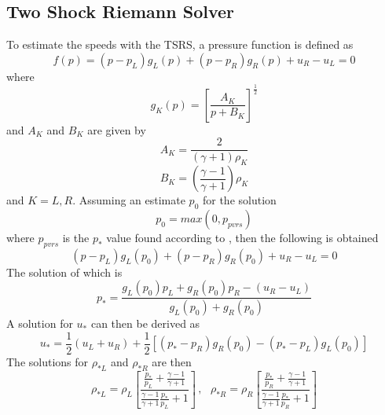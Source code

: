 \subsection{Two Shock Riemann Solver}\label{sect:TSRS}
To estimate the speeds with the TSRS, a pressure function is defined as
\begin{equation}
	f\left(p\right) = \left(p - p_L\right) g_L\left(p\right) + \left(p - p_R\right) g_R\left(p\right) + u_R - u_L = 0
\end{equation}
where
\begin{equation}
	g_K\left(p\right) = \left[\frac{A_K}{p + B_K}\right]^{\frac{1}{2}}
\end{equation}
and $A_K$ and $B_K$ are given by
\begin{equation}
	A_K = \frac{2}{\left(\gamma + 1\right) \rho_K}
\end{equation}
\begin{equation}
	B_K = \left(\frac{\gamma - 1}{\gamma + 1}\right) \rho_K
\end{equation}
and $K=L,R$. Assuming an estimate $p_0$ for the solution
\begin{equation}
	p_0 = max\left(0,p_{pvrs}\right)
\end{equation}
where $p_{pvrs}$ is the $p_*$ value found according to , then the following is obtained
\begin{equation}
	\left(p - p_L\right) g_L\left(p_0\right) + \left(p - p_R\right) g_R\left(p_0\right) + u_R - u_L = 0
\end{equation}
The solution of which is
\begin{equation}
	p_* = \frac{g_L\left(p_0\right) p_L + g_R\left(p_0\right) p_R - \left(u_R - u_L\right)}{g_L\left(p_0\right) + g_R\left(p_0\right)}
\end{equation}
A solution for $u_*$ can then be derived as
\begin{equation}
	u_* = \frac{1}{2} \left(u_L + u_R\right) + \frac{1}{2} \left[\left(p_* - p_R\right) g_R\left(p_0\right) - \left(p_* - p_L\right) g_L\left(p_0\right)\right]
\end{equation}
The solutions for $\rho_{*L}$ and $\rho_{*R}$ are then
\begin{equation}
	\rho_{*L} = \rho_L \left[\frac{\frac{p_*}{p_L} + \frac{\gamma - 1}{\gamma + 1}}{\frac{\gamma - 1}{\gamma + 1}\frac{p_*}{p_L} + 1}\right] \, , \,\,\,\, \rho_{*R} = \rho_R \left[\frac{\frac{p_*}{p_R} + \frac{\gamma - 1}{\gamma + 1}}{\frac{\gamma - 1}{\gamma + 1}\frac{p_*}{p_R} + 1}\right]
\end{equation}
